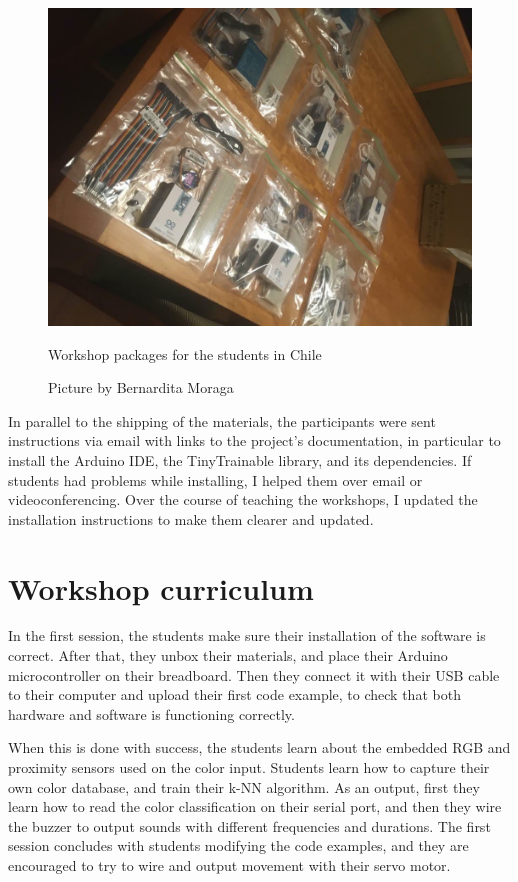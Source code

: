 \begin{figure}[ht]
  \centering
  \includegraphics[width=0.75\linewidth,height=0.25\textheight,keepaspectratio]{images/workshop-packages-chile.jpg}
  \caption{Workshop packages for the students in Chile}
  \caption*{Picture by Bernardita Moraga}
  \label{fig:workshop-packages-chile}
\end{figure}

In parallel to the shipping of the materials, the participants were sent instructions via email with links to the project's documentation, in particular to install the Arduino \acrshort{IDE}, the TinyTrainable library, and its dependencies. If students had problems while installing, I helped them over email or videoconferencing. Over the course of teaching the workshops, I updated the installation instructions to make them clearer and updated.

\section{Workshop curriculum}

In the first session, the students make sure their installation of the software is correct. After that, they unbox their materials, and place their Arduino microcontroller on their breadboard. Then they connect it with their USB cable to their computer and upload their first code example, to check that both hardware and software is functioning correctly.

When this is done with success, the students learn about the embedded RGB and proximity sensors used on the color input. Students learn how to capture their own color database, and train their \acrshort{k-NN} algorithm. As an output, first they learn how to read the color classification on their serial port, and then they wire the buzzer to output sounds with different frequencies and durations. The first session concludes with students modifying the code examples, and they are encouraged to try to wire and output movement with their servo motor.

